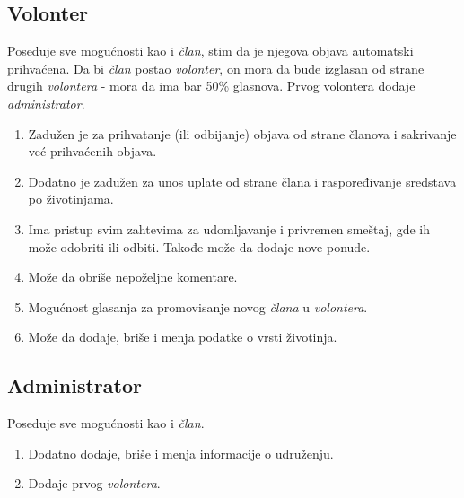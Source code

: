 \subsection{Volonter} 
    \par Poseduje sve mogućnosti kao i \textit{član}, stim da je njegova objava automatski prihvaćena. Da bi \textit{član} postao \textit{volonter}, on mora
    da bude izglasan od strane drugih \textit{volontera} - mora da ima bar 50\% glasnova. Prvog volontera dodaje \textit{administrator}. 
    \begin{enumerate}
        \item Zadužen je za prihvatanje (ili odbijanje) objava od strane članova i sakrivanje već prihvaćenih objava.
        \item Dodatno je zadužen za unos uplate od strane člana i raspoređivanje sredstava po životinjama.
        \item Ima pristup svim zahtevima za udomljavanje i privremen smeštaj, gde ih može odobriti ili odbiti. Takođe može da dodaje nove ponude.
        \item Može da obriše nepoželjne komentare.
        \item Mogućnost glasanja za promovisanje novog \textit{člana} u \textit{volontera}.
        \item Može da dodaje, briše i menja podatke o vrsti životinja.
    \end{enumerate}
\subsection{Administrator}
    \par Poseduje sve mogućnosti kao i \textit{član}. 
    \begin{enumerate}
        \item Dodatno dodaje, briše i menja informacije o udruženju. 
        \item Dodaje prvog \textit{volontera}.
    \end{enumerate}
    